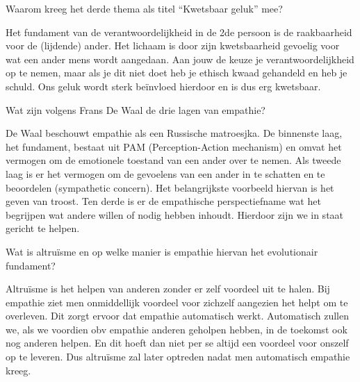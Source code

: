 \documentclass[main.tex]{subfiles}
\begin{document}
\begin{examenvraag}
    \begin{vraag}
        Waarom kreeg het derde thema als titel “Kwetsbaar geluk” mee?
    \end{vraag}

    \begin{antwoord}
	    Het fundament van de verantwoordelijkheid in de 2de persoon is de raakbaarheid voor de (lijdende) ander. Het lichaam is door zijn kwetsbaarheid gevoelig voor wat een ander mens wordt aangedaan. Aan jouw de keuze je verantwoordelijkheid op te nemen, maar als je dit niet doet heb je ethisch kwaad gehandeld en heb je schuld. Ons geluk wordt sterk be\"invloed hierdoor en is dus erg kwetsbaar.
    \end{antwoord}
\end{examenvraag}


\begin{examenvraag}
    \begin{vraag}
        Wat zijn volgens Frans De Waal de drie lagen van empathie?
    \end{vraag}

    \begin{antwoord}
    De Waal beschouwt empathie als een Russische matroesjka.‭ ‬De binnenste laag,‭ ‬het fundament,‭ 
    ‬bestaat uit PAM‭ (‬Perception-Action mechanism‭) ‬en omvat het vermogen om de emotionele toestand 
    van een ander over te nemen.‭ ‬Als tweede laag is er het vermogen om de gevoelens van een ander 
    in‭ ‬te schatten en te beoordelen (sympathetic concern).‭ ‬Het belangrijkste voorbeeld hiervan is het geven van troost.‭ 
    ‬Ten derde is er de empathische perspectiefname wat het begrijpen wat andere willen of nodig 
    hebben inhoudt.‭ ‬Hierdoor zijn we in staat gericht te helpen.
    \end{antwoord}
\end{examenvraag}


\begin{examenvraag}
    \begin{vraag}
        Wat is altruïsme en op welke manier is empathie hiervan het evolutionair fundament?
    \end{vraag}

    \begin{antwoord}

    	Altruïsme is het helpen van anderen zonder er zelf voordeel uit te halen.
		Bij empathie ziet men onmiddellijk voordeel voor zichzelf aangezien het helpt om te 
		overleven.‭ ‬Dit zorgt ervoor dat empathie automatisch werkt.‭ ‬Automatisch zullen we,‭ ‬als we 
		voordien obv empathie anderen geholpen hebben,‭ ‬in de toekomst ook nog anderen helpen.‭ ‬En 
		dit hoeft dan niet per se altijd een voordeel voor onszelf op te leveren.‭ ‬Dus altruïsme zal 
		later optreden nadat men automatisch empathie kreeg.
		

    	
    \end{antwoord}
\end{examenvraag}
\end{document}
